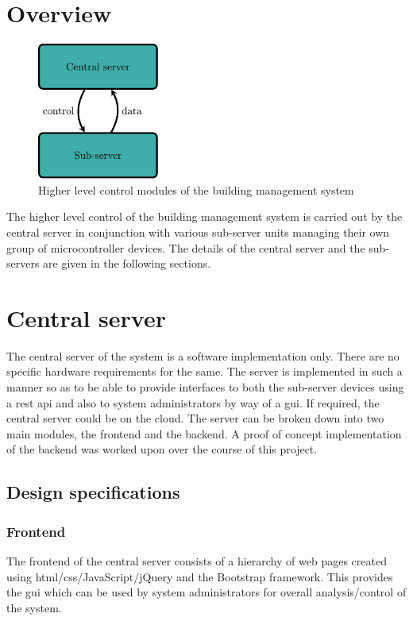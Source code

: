 \documentclass[letterpaper,11pt]{report}
\begin{document}
\section{Overview}
\begin{figure}[h]
\includegraphics[width=4cm, height=4.5cm]{des}
\centering
\captionsetup{justification=centering}
\caption{Higher level control modules of the building management system}
\label{fig:des}
\end{figure}
The higher level control of the building management system is carried out by the central server in conjunction with various sub-server units managing their own group of microcontroller devices. The details of the central server and the sub-servers are given in the following sections.
\section{Central server}
The central server of the system is a software implementation only. There are no specific hardware requirements for the same. The server is implemented in such a manner so as to be able to provide interfaces to both the sub-server devices using a \ac{rest} \ac{api} and also to system administrators by way of a \ac{gui}. If required, the central server could be on the cloud. The server can be broken down into two main modules, the frontend and the backend. A proof of concept implementation of the backend was worked upon over the course of this project.
\subsection{Design specifications}
\subsubsection{Frontend}
The frontend of the central server consists of a hierarchy of web pages created using \ac{html}/\newline \ac{css}/JavaScript/jQuery and the Bootstrap framework. This provides the \ac{gui} which can be used by system administrators for overall analysis/control of the system.
\end{document}
